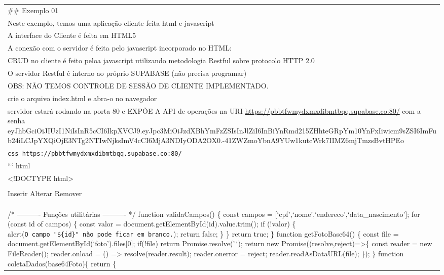 \documentclass[
]{book}
\begin{document}
\begin{longtable}[]{@{}
  >{\raggedright\arraybackslash}p{}@{}}
\toprule\noalign{}
\endhead
\bottomrule\noalign{}
\endlastfoot
\#\# Exemplo 01 \\
Neste exemplo, temos uma aplicação cliente feita html e javascript \\
A interface do Cliente é feita em HTML5 \\
A conexão com o servidor é feita pelo javascript incorporado no HTML: \\
CRUD no cliente é feito peloa javascript utilizando metodologia Restful sobre protocolo HTTP 2.0 \\
O servidor Restful é interno ao próprio SUPABASE (não precisa programar) \\
OBS: NÃO TEMOS CONTROLE DE SESSÃO DE CLIENTE IMPLEMENTADO. \\
crie o arquivo index.html e abra-o no navegador \\
servidor estará rodando na porta 80 e EXPÕE A API de operações na URI \url{https://pbbtfwmydxmxdibmtbqq.supabase.co:80/} com a senha eyJhbGciOiJIUzI1NiIsInR5cCI6IkpXVCJ9.eyJpc3MiOiJzdXBhYmFzZSIsInJlZiI6InBiYnRmd215ZHhteGRpYm10YnFxIiwicm9sZSI6ImFub24iLCJpYXQiOjE3NTg2NTIwNjksImV4cCI6MjA3NDIyODA2OX0.-41ZWZmoYbnA9YUw1kutcWrk7IIMZ6mjTmzsBvtHPEo \\
\texttt{css\ https://pbbtfwmydxmxdibmtbqq.supabase.co:80/} \\
``` html \\
\textless!DOCTYPE html\textgreater{} \\
 \\
Inserir
Alterar
Remover \\
 \\
 \\
 \\
/* ---------- Funções utilitárias ---------- */
function validaCampos() \{
const campos = {[}`cpf',`nome',`endereco',`data\_nascimento'{]};
for (const id of campos) \{
const valor = document.getElementById(id).value.trim();
if (!valor) \{
alert(\texttt{O\ campo\ "\$\{id\}"\ não\ pode\ ficar\ em\ branco.});
return false;
\}
\}
return true;
\}
function getFotoBase64() \{
const file = document.getElementById(`foto').files{[}0{]};
if(!file) return Promise.resolve('\,`);
return new Promise((resolve,reject)=\textgreater\{
const reader = new FileReader();
reader.onload = () =\textgreater{} resolve(reader.result);
reader.onerror = reject;
reader.readAsDataURL(file);
\});
\}
function coletaDados(base64Foto)\{
return \{

\end{longtable}
\end{document}
